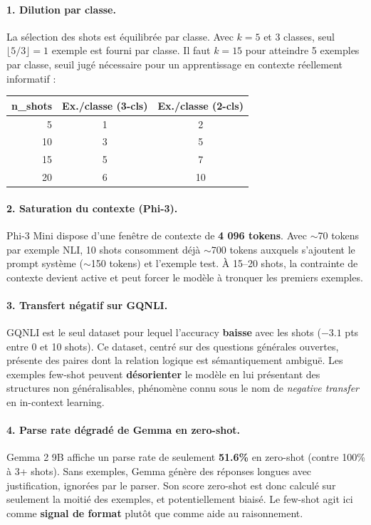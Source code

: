 \paragraph{1. Dilution par classe.}
La sélection des shots est équilibrée par classe. Avec $k=5$ et 3 classes, seul $\lfloor 5/3 \rfloor = 1$ exemple est fourni par classe. Il faut $k=15$ pour atteindre 5 exemples par classe, seuil jugé nécessaire pour un apprentissage en contexte réellement informatif :

\begin{center}
\begin{tabular}{rcc}
\toprule
\textbf{n\_shots} & \textbf{Ex./classe (3-cls)} & \textbf{Ex./classe (2-cls)} \\
\midrule
5  & 1 & 2  \\
10 & 3 & 5  \\
15 & 5 & 7  \\
20 & 6 & 10 \\
\bottomrule
\end{tabular}
\end{center}

\paragraph{2. Saturation du contexte (Phi-3).}
Phi-3 Mini dispose d'une fenêtre de contexte de \textbf{4 096 tokens}. Avec $\sim$70 tokens par exemple NLI, 10 shots consomment déjà $\sim$700 tokens auxquels s'ajoutent le prompt système ($\sim$150 tokens) et l'exemple test. À 15--20 shots, la contrainte de contexte devient active et peut forcer le modèle à tronquer les premiers exemples.

\paragraph{3. Transfert négatif sur GQNLI.}
GQNLI est le seul dataset pour lequel l'accuracy \textbf{baisse} avec les shots ($-3.1$ pts entre 0 et 10 shots). Ce dataset, centré sur des questions générales ouvertes, présente des paires dont la relation logique est sémantiquement ambiguë. Les exemples few-shot peuvent \textbf{désorienter} le modèle en lui présentant des structures non généralisables, phénomène connu sous le nom de \textit{negative transfer} en in-context learning.

\paragraph{4. Parse rate dégradé de Gemma en zero-shot.}
Gemma 2 9B affiche un parse rate de seulement \textbf{51.6\%} en zero-shot (contre 100\% à 3+ shots). Sans exemples, Gemma génère des réponses longues avec justification, ignorées par le parser. Son score zero-shot est donc calculé sur seulement la moitié des exemples, et potentiellement biaisé. Le few-shot agit ici comme \textbf{signal de format} plutôt que comme aide au raisonnement.

